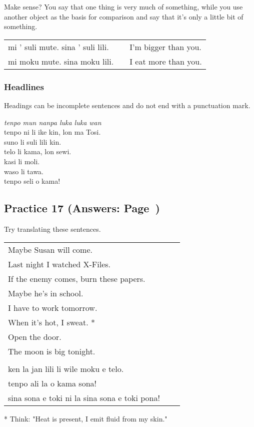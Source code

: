 Make sense? 
You say that one thing is very much of something, while you use another object as the basis for comparison and say that it's only a little bit of something. 

\begin{supertabular}{p{5,5cm}|ll}
mi ' suli mute. sina ' suli lili. && I'm bigger than you. \\
mi moku mute. sina moku lili. && I eat more than you. \\
\end{supertabular} 
%
\subsubsection*{Headlines} 
%
Headings can be incomplete sentences and do not end with a punctuation mark.

\textit{tenpo mun nanpa luka luka wan} \\
tenpo ni li ike kin, lon ma Tosi. \\
suno li suli lili kin. \\ 
telo li kama, lon sewi. \\
kasi li moli. \\
waso li tawa. \\
tenpo seli o kama! 

\newpage
\subsection*{Practice 17 (Answers: Page~\pageref{'la'})}
%
Try translating these sentences.

\begin{supertabular}{p{5,5cm}|ll}
Maybe Susan will come.  && \\ %
Last night I watched X-Files.  &&   \\ %
If the enemy comes, burn these papers.  &&   \\ %
Maybe he's in school.  &&   \\ %
I have to work tomorrow.  &&   \\ %
When it's hot, I sweat. *  &&  \\ %
Open the door.   &&  \\ %
The moon is big tonight.   &&  \\ %
 && \\ %
ken la jan lili li wile moku e telo.  &&   \\ %
tenpo ali la o kama sona!   &&  \\ %
sina sona e toki ni la sina sona e toki pona!   &&  \\ %
\end{supertabular}

* Think: "Heat is present, I emit fluid from my skin."
